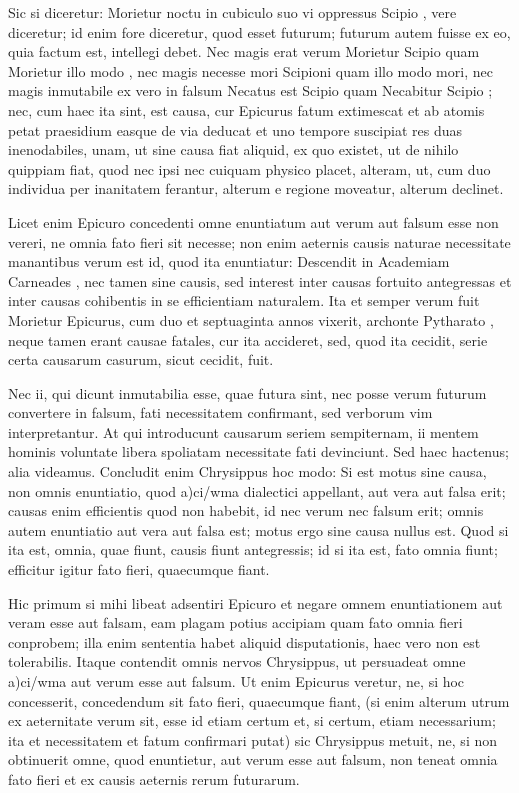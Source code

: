  Sic si diceretur: Morietur noctu in cubiculo suo vi oppressus Scipio , vere diceretur; id enim fore diceretur, quod esset futurum; futurum autem fuisse ex eo, quia factum est, intellegi debet. Nec magis erat verum Morietur Scipio quam Morietur illo modo , nec magis necesse mori Scipioni quam illo modo mori, nec magis inmutabile ex vero in falsum Necatus est Scipio quam Necabitur Scipio ; nec, cum haec ita sint, est causa, cur Epicurus fatum extimescat et ab atomis petat praesidium easque de via deducat et uno tempore suscipiat res duas inenodabiles, unam, ut sine causa fiat aliquid, ex quo existet, ut de nihilo quippiam fiat, quod nec ipsi nec cuiquam physico placet, alteram, ut, cum duo individua per inanitatem ferantur, alterum e regione moveatur, alterum declinet.

 Licet enim Epicuro concedenti omne enuntiatum aut verum aut falsum esse non vereri, ne omnia fato fieri sit necesse; non enim aeternis causis naturae necessitate manantibus verum est id, quod ita enuntiatur: Descendit in Academiam Carneades , nec tamen sine causis, sed interest inter causas fortuito antegressas et inter causas cohibentis in se efficientiam naturalem. Ita et semper verum fuit Morietur Epicurus, cum duo et septuaginta annos vixerit, archonte Pytharato , neque tamen erant causae fatales, cur ita accideret, sed, quod ita cecidit, serie certa causarum casurum, sicut cecidit, fuit.

 Nec ii, qui dicunt inmutabilia esse, quae futura sint, nec posse verum futurum convertere in falsum, fati necessitatem confirmant, sed verborum vim interpretantur. At qui introducunt causarum seriem sempiternam, ii mentem hominis voluntate libera spoliatam necessitate fati devinciunt. Sed haec hactenus; alia videamus. Concludit enim Chrysippus hoc modo: Si est motus sine causa, non omnis enuntiatio, quod a)ci/wma dialectici appellant, aut vera aut falsa erit; causas enim efficientis quod non habebit, id nec verum nec falsum erit; omnis autem enuntiatio aut vera aut falsa est; motus ergo sine causa nullus est. Quod si ita est, omnia, quae fiunt, causis fiunt antegressis; id si ita est, fato omnia fiunt; efficitur igitur fato fieri, quaecumque fiant.

 Hic primum si mihi libeat adsentiri Epicuro et negare omnem enuntiationem aut veram esse aut falsam, eam plagam potius accipiam quam fato omnia fieri conprobem; illa enim sententia habet aliquid disputationis, haec vero non est tolerabilis. Itaque contendit omnis nervos Chrysippus, ut persuadeat omne a)ci/wma aut verum esse aut falsum. Ut enim Epicurus veretur, ne, si hoc concesserit, concedendum sit fato fieri, quaecumque fiant, (si enim alterum utrum ex aeternitate verum sit, esse id etiam certum et, si certum, etiam necessarium; ita et necessitatem et fatum confirmari putat) sic Chrysippus metuit, ne, si non obtinuerit omne, quod enuntietur, aut verum esse aut falsum, non teneat omnia fato fieri et ex causis aeternis rerum futurarum.

